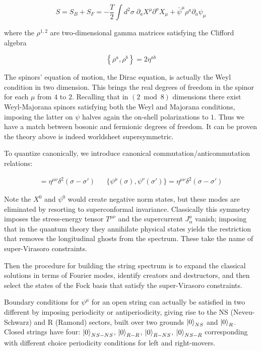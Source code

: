 \begin{equation}
S = S_B + S_F = -\frac{T}{2} \int d^2\sigma \; \partial_a X^\mu \partial^a X_\mu + \bar \psi^\mu \rho^a \partial_a \psi_\mu
\end{equation}

where the $\rho^{1,2}$ are two-dimensional gamma matrices satisfying the Clifford algebra

\begin{equation}
	\left\{ \rho^a,\rho^b \right\} = 2\eta^{ab}
	\label{}
\end{equation}

The spinors' equation of motion, the Dirac equation, is actually the Weyl condition in two dimension. This brings the real degrees of freedom in the spinor for each $\mu$ from $4$ to $2$. Recalling that in $(2\bmod 8)$ dimensions there exist Weyl-Majorana spinors satisfying both the Weyl and Majorana conditions, imposing the latter on $\psi$ halves again the on-shell polarizations to $1$. Thus we have a match between bosonic and fermionic degrees of freedom. It can be proven the theory above is indeed worldsheet supersymmetric.

To quantize canonically, we introduce canonical commutation/anticommutation relations:

\begin{align}
[X^\mu(\sigma),X^\nu(\sigma')] = \eta^{\mu\nu} \delta^2(\sigma-\sigma') && \{\psi^\mu(\sigma),\psi^\nu(\sigma')\} = \eta^{\mu\nu} \delta^2(\sigma-\sigma')
\end{align}

Note the $X^0$ and $\psi^0$ would create negative norm states, but these modes are eliminated by resorting to superconformal invariance. Classically this symmetry imposes the stress-energy tensor $T^{\mu\nu}$ and the supercurrent $J^a_\alpha$ vanish; imposing that in the quantum theory they annihilate physical states yields the restriction that removes the longitudinal ghosts from the spectrum. These take the name of super-Virasoro constraints. 

Then the procedure for building the string spectrum is to expand the classical solutions in terms of Fourier modes, identify creators and destructors, and then select the states of the Fock basis that satisfy the super-Virasoro constraints.

Boundary conditions for $\psi^\mu$ for an open string can actually be satisfied in two different by imposing periodicity or antiperiodicity, giving rise to the NS (Neveu-Schwarz) and R (Ramond) sectors, built over two grounds $\ket{0}_{NS}$ and $\ket{0}_R$. Closed strings have four: $\ket{0}_{NS-NS}$, $\ket{0}_{R-R}$, $\ket{0}_{R-NS}$, $\ket{0}_{NS-R}$ corresponding with different choice periodicity conditions for left and right-movers.

